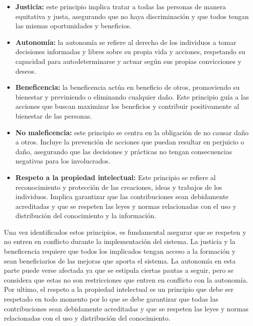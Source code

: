 \begin{itemize}
    \item \textbf{Justicia:} este principio implica tratar a todas las personas 
    de manera equitativa y justa, asegurando que no haya discriminación 
    y que todos tengan las mismas oportunidades y beneficios.
    \item \textbf{Autonomía:} la autonomía se refiere al derecho de los individuos 
    a tomar decisiones informadas y libres sobre su propia vida y acciones, 
    respetando su capacidad para autodeterminarse y actuar según sus propias 
    convicciones y deseos.
    \item \textbf{Beneficencia:} la beneficencia actúa en beneficio de otros, 
    promoviendo su bienestar y previniendo o eliminando cualquier daño. Este 
    principio guía a las acciones que buscan maximizar los beneficios y contribuir 
    positivamente al bienestar de las personas.
    \item \textbf{No maleficencia:} este principio se centra en la obligación de 
    no causar daño a otros. Incluye la prevención de acciones que puedan resultar 
    en perjuicio o daño, asegurando que las decisiones y prácticas no tengan 
    consecuencias negativas para los involucrados.
    \item \textbf{Respeto a la propiedad intelectual:} Este principio se refiere al 
    reconocimiento y protección de las creaciones, ideas y trabajos de los 
    individuos. Implica garantizar que las contribuciones sean debidamente 
    acreditadas y que se respeten las leyes y normas relacionadas con el uso 
    y distribución del conocimiento y la información.
\end{itemize}

Una vez identificados estos principios, es fundamental asegurar que se respeten
y no entren en conflicto durante la implementación del sistema. La justicia y la
beneficencia requiere que todos los implicados tengan acceso a la formación y
sean beneficiarios de las mejoras que aporta el sistema. La autonomía en esta parte
puede verse afectada ya que se estipula ciertas pautas a seguir, pero se considera
que estas no son restricciones que entren en conflicto con la autonomía. Por ultimo,
el respeto a la propiedad intelectual es un principio que debe ser respetado en todo
momento por lo que se debe garantizar que todas las contribuciones sean debidamente
acreditadas y que se respeten las leyes y normas relacionadas con el uso y distribución
del conocimiento.

